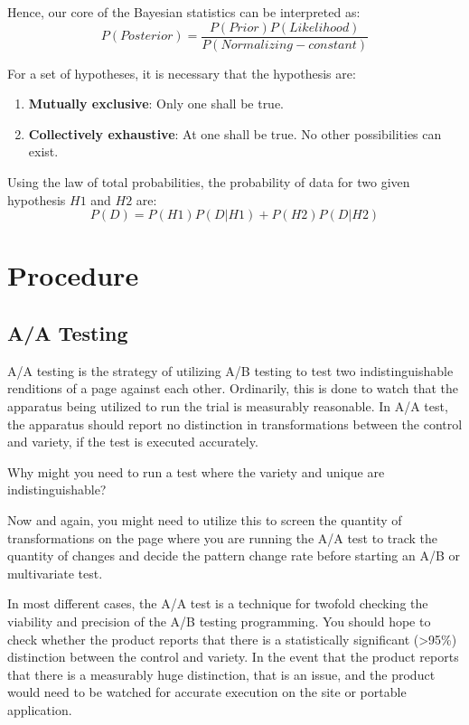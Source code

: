 Hence, our core of the Bayesian statistics can be interpreted as:
\begin{equation} \label{eq3}
P(Posterior) = \frac{P(Prior)P(Likelihood)}{P(Normalizing-constant)}
\end{equation}

For a set of hypotheses, it is necessary that the hypothesis are:
\begin{enumerate}
\item \textbf{Mutually exclusive}: Only one shall be true.
\item \textbf{Collectively exhaustive}: At one shall be true. No other possibilities can exist.
\end{enumerate}

Using the law of total probabilities, the probability of data for two given hypothesis $H1$ and $H2$ are:
\begin{equation} \label{eq3}
P(D) = P(H1)P(D|H1) + P(H2)P(D|H2)
\end{equation}

\section{Procedure}

\subsection{A/A Testing}
A/A testing is the strategy of utilizing A/B testing to test two indistinguishable renditions of a page against each other. Ordinarily, this is done to watch that the apparatus being utilized to run the trial is measurably reasonable. In A/A test, the apparatus should report no distinction in transformations between the control and variety, if the test is executed accurately. 

Why might you need to run a test where the variety and unique are indistinguishable? 

Now and again, you might need to utilize this to screen the quantity of transformations on the page where you are running the A/A test to track the quantity of changes and decide the pattern change rate before starting an A/B or multivariate test. 

In most different cases, the A/A test is a technique for twofold checking the viability and precision of the A/B testing programming. You should hope to check whether the product reports that there is a statistically significant (>95\%) distinction between the control and variety. In the event that the product reports that there is a measurably huge distinction, that is an issue, and the product would need to be watched for accurate execution on the site or portable application.

